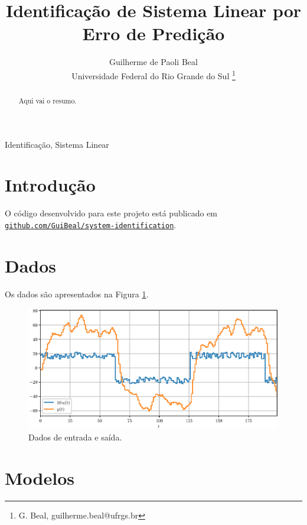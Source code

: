 \documentclass{ppgeesa}
\begin{document}

\title{Identificação de Sistema Linear por Erro de Predição}
\author{Guilherme de Paoli Beal
  \\
  {\small Universidade Federal do Rio Grande do Sul}
  \thanks{G. Beal, guilherme.beal@ufrgs.br}
}
\maketitle
\thispagestyle{empty}\pagestyle{empty}

\begin{abstract}
  Aqui vai o resumo.
\end{abstract}

\begin{IEEEkeywords}
  Identificação, Sistema Linear
\end{IEEEkeywords}

\section{Introdução}

O código desenvolvido para este projeto está publicado em \href{https://github.com/GuiBeal/system-identification}{\texttt{github.com/GuiBeal/system-identification}}.

\section{Dados}

Os dados são apresentados na Figura \ref{fig:data}.

\begin{figure}[!htbp]
  \centering
  \includegraphics[width=\linewidth]{data}
  \caption{Dados de entrada e saída.}
  \label{fig:data}
\end{figure}

\section{Modelos}
\end{document}
